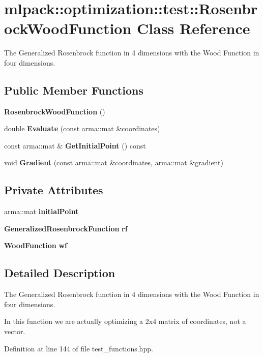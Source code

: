 \section{mlpack\+:\+:optimization\+:\+:test\+:\+:Rosenbrock\+Wood\+Function Class Reference}
\label{classmlpack_1_1optimization_1_1test_1_1RosenbrockWoodFunction}


The Generalized Rosenbrock function in 4 dimensions with the Wood Function in four dimensions.  


\subsection*{Public Member Functions}
\begin{DoxyCompactItemize}
\item 
{\bf Rosenbrock\+Wood\+Function} ()
\item 
double {\bf Evaluate} (const arma\+::mat \&coordinates)
\item 
const arma\+::mat \& {\bf Get\+Initial\+Point} () const 
\item 
void {\bf Gradient} (const arma\+::mat \&coordinates, arma\+::mat \&gradient)
\end{DoxyCompactItemize}
\subsection*{Private Attributes}
\begin{DoxyCompactItemize}
\item 
arma\+::mat {\bf initial\+Point}
\item 
{\bf Generalized\+Rosenbrock\+Function} {\bf rf}
\item 
{\bf Wood\+Function} {\bf wf}
\end{DoxyCompactItemize}


\subsection{Detailed Description}
The Generalized Rosenbrock function in 4 dimensions with the Wood Function in four dimensions. 

In this function we are actually optimizing a 2x4 matrix of coordinates, not a vector. 

Definition at line 144 of file test\+\_\+functions.\+hpp.



